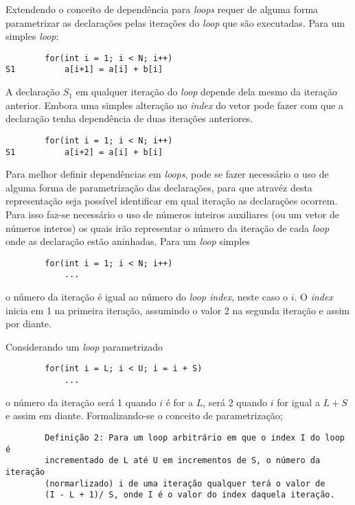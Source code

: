Extendendo o conceito de dependência para \textit{loops} requer de alguma forma 
parametrizar as declarações pelas iterações do \textit{loop} que são
executadas.
Para um simples \textit{loop}:

\begin{verbatim}
        for(int i = 1; i < N; i++)
S1          a[i+1] = a[i] + b[i]
\end{verbatim}

A declaração $S_1$ em qualquer iteração do \textit{loop} depende dela mesmo da
iteração anterior. Embora uma simples alteração no \textit{index} do vetor pode
fazer com que a declaração tenha dependência de duas iterações anteriores.

\begin{verbatim}
        for(int i = 1; i < N; i++)
S1          a[i+2] = a[i] + b[i]
\end{verbatim}

Para melhor definir dependências em \textit{loops},  pode se fazer necessário o
uso de alguma forma de parametrização das declarações, para que atravéz desta
representação seja possível identificar em qual iteração as declarações ocorrem.
Para isso faz-se necessário o uso de números inteiros auxiliares (ou um vetor de
números interos) os quais irão representar o número da iteração de cada 
\textit{loop} onde as declaração estão aninhadas.
Para um \textit{loop} simples

\begin{verbatim}
        for(int i = 1; i < N; i++)
            ...
\end{verbatim}

o número da iteração é igual ao número do \textit{loop index}, neste caso o $i$.
O \textit{index} inicia em 1 na primeira iteração, assumindo o valor 2 na
segunda iteração e assim por diante.

Considerando um \textit{loop} parametrizado

\begin{verbatim}
        for(int i = L; i < U; i = i + S)
            ...
\end{verbatim}

o número da iteração será 1 quando $i$ é for a $L$, será 2 quando $i$ for
igual a $L+S$ e assim em diante. 
Formalizando-se o conceito de parametrização;

\begin{verbatim}
        Definição 2: Para um loop arbitrário em que o index I do loop é
        incrementado de L até U em incrementos de S, o número da iteração
        (normarlizado) i de uma iteração qualquer terá o valor de 
        (I - L + 1)/ S, onde I é o valor do index daquela iteração.
\end{verbatim}

